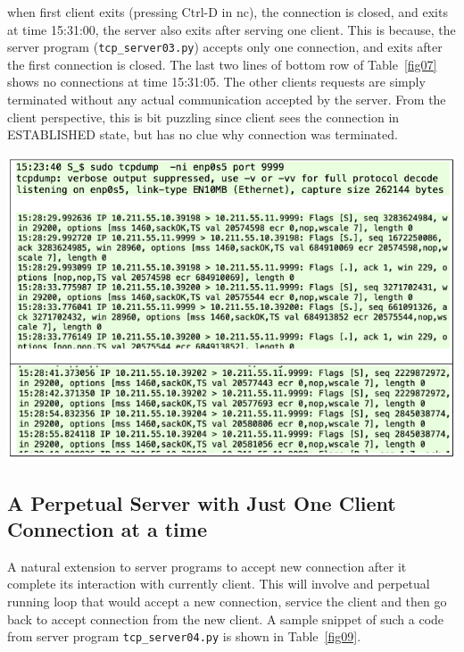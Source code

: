 \begin{multicols}{2}

when first client exits (pressing Ctrl-D in nc), the connection is closed,  and exits at time 15:31:00, the server also exits after serving one client. This is because, the server program (\texttt{tcp\_server03.py}) accepts only one connection, and exits after the first connection is closed. The last two lines of bottom row of Table~\ref{fig07} shows no connections at time 15:31:05. The other clients requests are simply terminated without any actual communication accepted by the server. From the client perspective, this is bit puzzling since client sees the connection in ESTABLISHED state, but has no clue why connection was terminated.

\end{multicols}


\begin{table}[H]
\centering
\includegraphics[scale=3.06]{src/Figures/chap1/fig08.jpg}
\end{table}

\begin{multicols}{2}

\setcounter{section}{4}
\section{A Perpetual Server with Just One Client Connection at a time}

A natural extension to server programs to accept new connection after it complete its interaction with currently client. This will involve and perpetual running loop that would accept a new connection, service the client and then go back to accept connection from the new client. A sample snippet of such a code from server program \texttt{tcp\_server04.py} \cite{art1-key04} is shown in Table~\ref{fig09}. 

\end{multicols}


